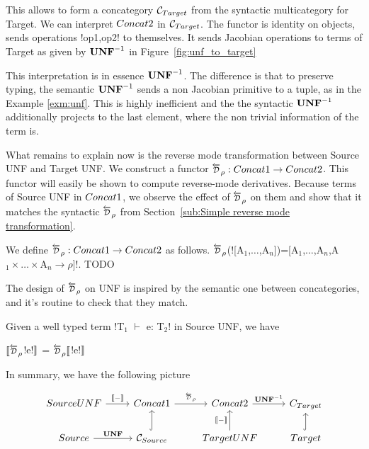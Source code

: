 This allows to form a concategory $\mathcal{C}_{Target}$ from the syntactic multicategory for Target.
We can interpret $Concat2$ in $\mathcal{C}_{Target}$. 
The functor is identity on objects, sends operations !op1,op2! to themselves. 
It sends Jacobian operations to terms of Target as given by $\mathbf{UNF}^{-1}$ in Figure~\ref{fig:unf_to_target}

This interpretation is in essence $\mathbf{UNF}^{-1}$. 
The difference is that to preserve typing, the semantic $\mathbf{UNF}^{-1}$
sends a non Jacobian primitive to a tuple, as in the Example \ref{exm:unf}. 
This is highly inefficient and the the syntactic $\mathbf{UNF}^{-1}$ 
additionally projects to the last element, where the non trivial information of the term is.

What remains to explain now is the reverse mode transformation between Source UNF and Target UNF.
We construct a functor $\Dsynrevsymbol_{\rho}:\ConcatS\to\ConcatT$. 
This functor will easily be shown to compute reverse-mode derivatives.
Because terms of Source UNF in $Concat1$, we observe the effect of $\Dsynrevsymbol_{\rho}$ on them
and show that it matches the syntactic $\Dsynrevsymbol_{\rho}$ 
from Section~\ref{sub:Simple reverse mode transformation}.

\begin{definition}
    We define $\Dsynrevsymbol_{\rho}:\ConcatS\to\ConcatT$ as follows.
    $\Dsynrevsymbol_{\rho}$(![A$_1$,$\ldots$,A$_n$])=[A$_1$,$\ldots$,A$_n$,A$_1\times\ldots\times$A$_n\to \rho$]!.
    TODO
\end{definition}

The design of $\Dsynrevsymbol_{\rho}$ on UNF is inspired by the semantic one between concategories, 
and it's routine to check that they match. 

\begin{proposition}
    Given a well typed term !T$_1$ $\vdash$ e: T$_2$! in Source UNF, we have
    \begin{center}
        $\seml\Dsynrevsymbol_{\rho}$!e!$\rrbracket$ = $\Dsynrevsymbol_{\rho}\seml$!e!$\rrbracket$
    \end{center}
\end{proposition}

In summary, we have the following picture

\[
\begin{tikzcd}
    SourceUNF \ar[r,"\sem{-}"] & Concat1 \ar[r,"\Dsynrevsymbol_{\rho}"] & Concat2 \ar[r,"\UNFSymbol^{-1}"] & C_{Target} \\
    Source \ar[r,"\UNFSymbol"] & \CSource \ar[u, hook] & TargetUNF \ar[u,"\sem{-}"] & Target \ar[u, hook] 
\end{tikzcd}
\]

